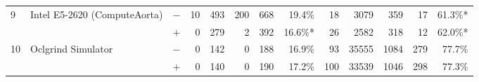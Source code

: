 \begin{tabular}{lll | rrrrr | rrrrr }
\hline
\multirow{ 2}{*}{9} & \multirow{ 2}{*}{Intel E5-2620 (ComputeAorta)} & $-$ & 10 & 493 & 200 & 668 & 19.4\%       & 18 & 3079 & 359 & 17 & 61.3\%* \\& & $+$ & 0 & 279 & 2 & 392 & 16.6\%* & 26 & 2582 & 318 & 12 & 62.0\%* \\
\hline
\multirow{ 2}{*}{10} & \multirow{ 2}{*}{Oclgrind Simulator} & $-$ & 0 & 142 & 0 & 188 & 16.9\%       & 93 & 35555 & 1084 & 279 & 77.7\% \\& & $+$ & 0 & 140 & 0 & 190 & 17.2\% & 100 & 33539 & 1046 & 298 & 77.3\% \\
  \bottomrule
\end{tabular}

